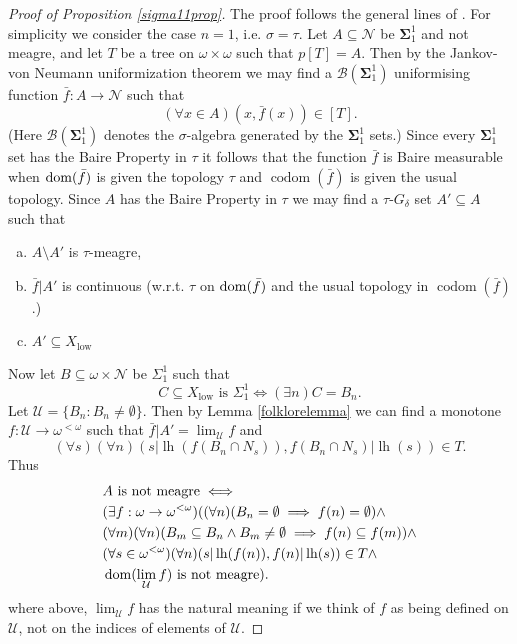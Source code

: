 \documentclass[11pt, english]{article}
\DeclareMathOperator{\lh}{lh} \DeclareMathOperator{\inn}{Inn}
\DeclareMathOperator{\low}{low}
\DeclareMathOperator{\codom}{codom}
\newcommand{\baire}{\mathscr N}
\def\bSigma{{\boldsymbol{\Sigma}}}
\begin{document}
\begin{proof}[Proof of Proposition \ref{sigma11prop}]
The proof follows the general lines of \cite[Theorem
2.2.5]{kechris73}. For simplicity we consider the case $n=1$, i.e.
$\sigma=\tau$. Let $A\subseteq \baire$ be $\bSigma^1_1$ and not
meagre, and let $T$ be a tree on $\omega\times\omega$ such that
$p[T]=A$. Then by the Jankov-von Neumann uniformization theorem
\cite[18.1]{kechris95} we may find a $\mathcal B(\bSigma^1_1)$
uniformising function $\bar f:A\to \baire$ such that
$$
(\forall x\in A) (x,\bar f(x))\in [T].
$$
(Here $\mathcal B(\bSigma^1_1)$ denotes the $\sigma$-algebra
generated by the $\bSigma^1_1$ sets.) Since every $\bSigma^1_1$
set has the Baire Property in $\tau$ it follows that the function
$\bar f$ is Baire measurable when $\operatorname{dom}(\bar f)$ is given the
topology $\tau$ and $\codom(\bar f)$ is given the usual topology.
Since $A$ has the Baire Property in $\tau$ we may find a
$\tau$-$G_\delta$ set $A'\subseteq A$ such that
\begin{enumerate}[(a)]
\item $A\setminus A'$ is $\tau$-meagre, \item $\bar f|A'$ is
continuous (w.r.t. $\tau$ on $\operatorname{dom}(\bar f)$ and the usual topology
in $\codom(\bar f)$.) \item $A'\subseteq X_{\low}$
\end{enumerate}
Now let $B\subseteq\omega\times\baire$ be $\Sigma^1_1$ such that
$$
C\subseteq X_{\low} \text{ is } \Sigma^1_1\iff (\exists n) C=B_n.
$$
Let $\mathcal U=\{B_n: B_n\neq\emptyset\}$. Then by Lemma
\ref{folklorelemma} we can find a monotone $f:\mathcal
U\to\omega^{<\omega}$ such that $\bar f|A'=\lim_{\mathcal U} f$
and
$$
(\forall s)(\forall n)(s|\lh(f(B_n\cap N_s)),f(B_n\cap
N_s)|\lh(s))\in T.
$$
Thus
\begin{align*}
&A\text{ is not meagre}\iff\\
&(\exists f:\omega\to\omega^{<\omega}) ((\forall n) (B_n=\emptyset\implies f(n)=\emptyset)\wedge\\
&(\forall m)(\forall n)(B_m\subseteq B_n\wedge
B_m\neq\emptyset\implies f(n)\subseteq
f(m))\wedge\\
& (\forall s\in\omega^{<\omega})(\forall
n)(s|\lh(f(n)),f(n)|\lh(s))\in
T\wedge \\
&\dom(\lim_{\mathcal U} f) \text{ is not meagre}).
\end{align*}
where above, $\lim_{\mathcal U} f$ has the natural meaning if we
think of $f$ as being defined on $\mathcal U$, not on the indices
of elements of $\mathcal U$.


\end{proof}
\end{document}
